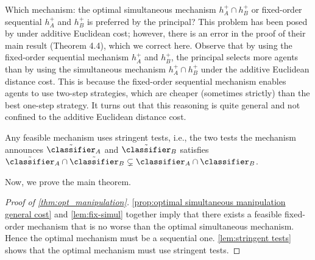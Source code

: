 Which mechanism: the optimal simultaneous mechanism  $h_{A}^{+}\cap h_{B}^{+}$ or fixed-order sequential $%
h_{A}^{+}$ and $h_{B}^{+}$ is preferred by the principal? This
problem has been posed by \citet{zigzag} under additive Euclidean cost; however, there is an error in the proof of their main result (Theorem 4.4), which we correct here. 
Observe that by using the fixed-order sequential mechanism $%
h_{A}^{+}$ and $h_{B}^{+}$, the principal selects more agents than
by using the simultaneous mechanism $h_{A}^{+}\cap h_{B}^{+}$ under the additive Euclidean distance cost. This is
because the fixed-order sequential mechanism enables agents to use two-step
strategies, which are cheaper (sometimes strictly) than the best one-step
strategy. It turns out that this reasoning is quite general and not confined to the additive Euclidean distance cost.



\begin{lemma}\label{lem:stringent tests}
    Any feasible mechanism uses stringent tests, i.e., the two tests the mechanism announces $\tilde\classifier_A$ and $\tilde\classifier_B$  satisfies $\tilde\classifier_A\cap\tilde\classifier_B\subsetneq \classifier_A\cap\classifier_B$.
\end{lemma}



Now, we prove the main theorem.

\begin{proof}[Proof of \cref{thm:opt_manipulation}]


    \cref{prop:optimal simultaneous manipulation general cost} and  \cref{lem:fix-simul} together imply that there exists a feasible fixed-order mechanism that is no worse than the optimal simultaneous mechanism. Hence the optimal mechanism must be a sequential one.
    \cref{lem:stringent tests} shows that the optimal mechanism must use stringent tests.
\end{proof}


